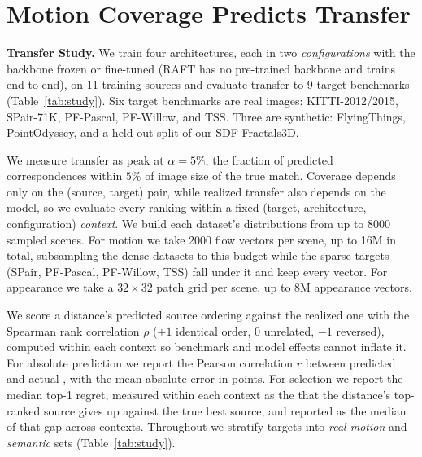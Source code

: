 \section{Motion Coverage Predicts Transfer}
\label{sec:law}

\noindent\textbf{Transfer Study.}
We train four architectures, each in two \emph{configurations} with the backbone
frozen or fine-tuned (RAFT has no pre-trained backbone and trains end-to-end), on 11 training
sources and evaluate transfer to 9 target benchmarks (Table~\ref{tab:study}). Six target benchmarks are real images:
KITTI-2012/2015, SPair-71K, PF-Pascal, PF-Willow, and TSS. Three are
synthetic: FlyingThings, PointOdyssey, and a held-out split of our SDF-Fractals3D. 

We measure transfer as peak \pck{} at $\alpha{=}5\%$, the fraction of predicted
correspondences within $5\%$ of image size of the true match. 
Coverage depends only on the (source, target) pair, while realized transfer also
depends on the model, so we evaluate every ranking within a fixed (target,
architecture, configuration) \emph{context}. We build each dataset's distributions from up to 8000 sampled scenes. For motion we
take 2000 flow vectors per scene, up to 16M in total, subsampling the dense datasets
to this budget while the sparse targets (SPair, PF-Pascal, PF-Willow, TSS) fall under
it and keep every vector. For appearance we take a $32\times32$ patch grid per scene,
up to 8M appearance vectors.

We score a distance's predicted source ordering against the realized one with the
Spearman rank correlation $\rho$ ($+1$ identical order, $0$ unrelated, $-1$ reversed),
computed within each context so benchmark and model effects cannot inflate it. For
absolute prediction we report the Pearson correlation $r$ between predicted and actual
\pck{}, with the mean absolute error in \pck{} points. For selection we report the
median top-1 regret, measured within each context as the \pck{} that the distance's
top-ranked source gives up against the true best source, and reported as the median
of that gap across contexts. Throughout we stratify targets into \emph{real-motion} and
\emph{semantic} sets (Table~\ref{tab:study}).

